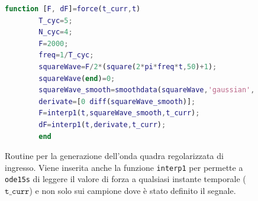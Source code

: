 \begin{figure}[t!]
	\begin{lstlisting}[language=matlab]
		function [F, dF]=force(t_curr,t)	
		T_cyc=5;
		N_cyc=4;
		F=2000;
		freq=1/T_cyc;
		squareWave=F/2*(square(2*pi*freq*t,50)+1);
		squareWave(end)=0;
		squareWave_smooth=smoothdata(squareWave,'gaussian',(size(t)/N_cyc)*0.05);
		derivate=[0 diff(squareWave_smooth)];
		F=interp1(t,squareWave_smooth,t_curr);
		dF=interp1(t,derivate,t_curr);
		end
	\end{lstlisting}
	\caption{Routine per la generazione dell'onda quadra regolarizzata di ingresso. Viene inserita anche la funzione \texttt{interp1} per permette a \texttt{ode15s} di leggere il valore di forza a qualsiasi instante temporale ($\mathtt{t\_curr}$) e non solo sui campione dove è stato definito il segnale.}
	\label{fig:force}
\end{figure}







